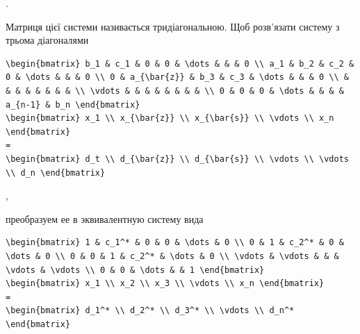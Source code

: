 \documentclass[
  ukrainian,
]{article}
\begin{document}
.

Матриця цієї системи називається тридіагональною. Щоб розв'язати систему
з трьома діагоналями

\begin{verbatim}
\begin{bmatrix} b_1 & c_1 & 0 & 0 & \dots & & & 0 \\ a_1 & b_2 & c_2 & 0 & \dots & & & 0 \\ 0 & a_{\bar{z}} & b_3 & c_3 & \dots & & & 0 \\ & & & & & & & & \\ \vdots & & & & & & & & \\ 0 & 0 & 0 & \dots & & & & a_{n-1} & b_n \end{bmatrix}
\begin{bmatrix} x_1 \\ x_{\bar{z}} \\ x_{\bar{s}} \\ \vdots \\ x_n \end{bmatrix}
=
\begin{bmatrix} d_t \\ d_{\bar{z}} \\ d_{\bar{s}} \\ \vdots \\ \vdots \\ d_n \end{bmatrix}
\end{verbatim}

,

преобразуем ее в эквивалентную систему вида

\begin{verbatim}
\begin{bmatrix} 1 & c_1^* & 0 & 0 & \dots & 0 \\ 0 & 1 & c_2^* & 0 & \dots & 0 \\ 0 & 0 & 1 & c_2^* & \dots & 0 \\ \vdots & \vdots & & & \vdots & \vdots \\ 0 & 0 & \dots & & 1 \end{bmatrix}
\begin{bmatrix} x_1 \\ x_2 \\ x_3 \\ \vdots \\ x_n \end{bmatrix}
=
\begin{bmatrix} d_1^* \\ d_2^* \\ d_3^* \\ \vdots \\ d_n^* \end{bmatrix}
\end{verbatim}
\end{document}
